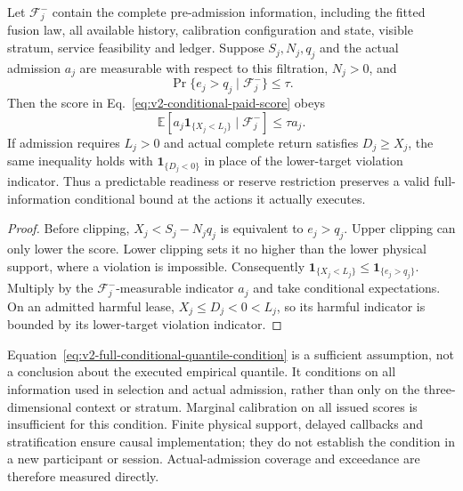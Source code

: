 \begin{proposition}
\label{prop:v2-conditional-admission-validity}
Let $\mathcal F_j^-$ contain the complete pre-admission information,
including the fitted fusion law, all available history, calibration
configuration and state, visible stratum, service feasibility and ledger.
Suppose $S_j,N_j,q_j$ and the actual admission $a_j$ are measurable
with respect to this filtration, $N_j>0$, and
\begin{equation}
 \Pr\{e_j>q_j\mid\mathcal F_j^-\}\leq\tau.
 \label{eq:v2-full-conditional-quantile-condition}
\end{equation}
Then the score in Eq.~\eqref{eq:v2-conditional-paid-score} obeys
\begin{equation}
 \mathbb E[a_j\mathbf1_{\{X_j<L_j\}}\mid\mathcal F_j^-]
 \leq\tau a_j.
 \label{eq:v2-actual-conditional-coverage}
\end{equation}
If admission requires $L_j>0$ and actual complete return satisfies
$D_j\geq X_j$, the same inequality holds with
$\mathbf1_{\{D_j<0\}}$ in place of the lower-target violation indicator.
Thus a predictable readiness or reserve restriction preserves a valid
full-information conditional bound at the actions it actually executes.
\end{proposition}
\begin{proof}
Before clipping, $X_j<S_j-N_jq_j$ is equivalent to $e_j>q_j$.
Upper clipping can only lower the score. Lower clipping sets it no
higher than the lower physical support, where a violation is impossible.
Consequently $\mathbf1_{\{X_j<L_j\}}\leq\mathbf1_{\{e_j>q_j\}}$.
Multiply by the $\mathcal F_j^-$-measurable indicator $a_j$ and take
conditional expectations. On an admitted harmful lease,
$X_j\leq D_j<0<L_j$, so its harmful indicator is bounded by its
lower-target violation indicator.
\end{proof}
Equation~\eqref{eq:v2-full-conditional-quantile-condition} is a
sufficient assumption, not a conclusion about the executed empirical
quantile. It conditions on all information used in selection and actual
admission, rather than only on the three-dimensional context or stratum.
Marginal calibration on all issued scores is insufficient for this
condition. Finite physical support, delayed callbacks and stratification
ensure causal implementation; they do not establish the condition in a
new participant or session. Actual-admission coverage and exceedance are
therefore measured directly.

